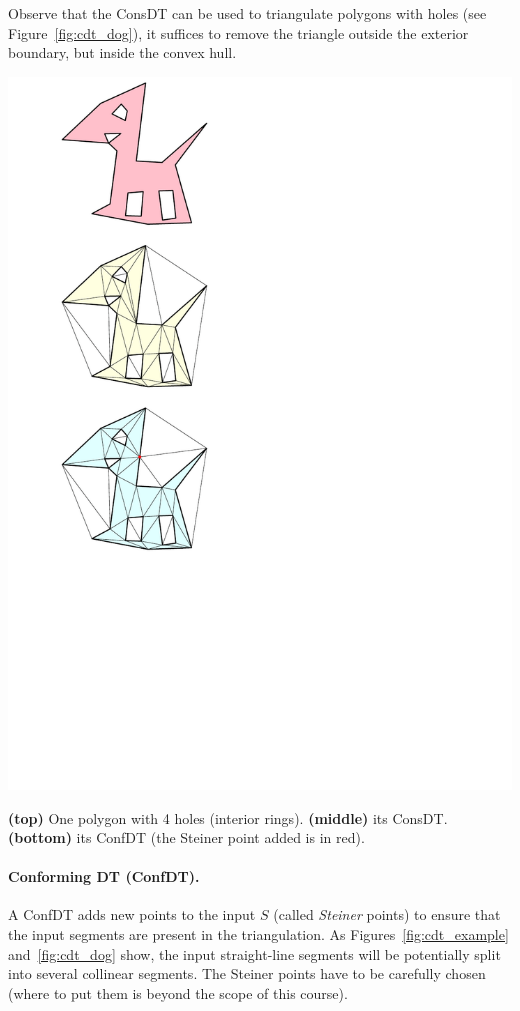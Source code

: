 %

Observe that the ConsDT can be used to triangulate polygons with holes (see Figure~\ref{fig:cdt_dog}), it suffices to remove the triangle outside the exterior boundary, but inside the convex hull.
\begin{marginfigure}
  \centering
  \includegraphics[width=0.8\linewidth]{cdt_dog}
  \caption{\textbf{(top)} One polygon with 4 holes (interior rings). \textbf{(middle)} its ConsDT\@. \textbf{(bottom)} its ConfDT (the Steiner point added is in red).}%
\label{fig:cdt_dog}
\end{marginfigure}


%
\paragraph*{Conforming DT (ConfDT).}
A ConfDT adds new points to the input $S$ (called \emph{Steiner} points) to ensure that the input segments are present in the triangulation.%
As Figures~\ref{fig:cdt_example} and~\ref{fig:cdt_dog} show, the input straight-line segments will be potentially split into several collinear segments. 
The Steiner points have to be carefully chosen (where to put them is beyond the scope of this course).

